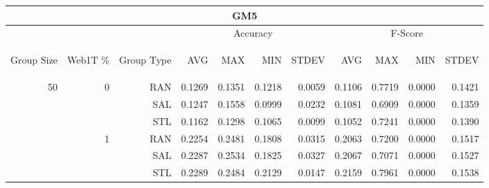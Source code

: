 \begin{center}
\begin{table}[htbp]
\begin{tabular}{ | r | r | r | r | r | r | r | r | r | r | r |}
\hline
\multicolumn{11}{|c|}{GM5}\\
\hline
 & & & \multicolumn{4}{|c|}{Accuracy} & \multicolumn{4}{|c|}{F-Score}\\ \cline{4-11}
\begin{sideways}Group Size\end{sideways} & \begin{sideways}Web1T \%\end{sideways} & \begin{sideways}Group Type\end{sideways} & \begin{sideways}AVG\end{sideways} & \begin{sideways}MAX\end{sideways} & \begin{sideways}MIN\end{sideways} & \begin{sideways}STDEV\end{sideways} & \begin{sideways}AVG\end{sideways} & \begin{sideways}MAX\end{sideways} & \begin{sideways}MIN\end{sideways} & \begin{sideways}STDEV\end{sideways}\\
\hline
\multirow{18}{*}{50}
 & \multirow{3}{*}{0} & RAN & 0.1269 & 0.1351 & 0.1218 & 0.0059 & 0.1106 & 0.7719 & 0.0000 & 0.1421\\ \cline{3-11}
 &   & SAL & 0.1247 & 0.1558 & 0.0999 & 0.0232 & 0.1081 & 0.6909 & 0.0000 & 0.1359\\ \cline{3-11}
 &   & STL & 0.1162 & 0.1298 & 0.1065 & 0.0099 & 0.1052 & 0.7241 & 0.0000 & 0.1390\\ \cline{2-11}
 & \multirow{3}{*}{1} & RAN & 0.2254 & 0.2481 & 0.1808 & 0.0315 & 0.2063 & 0.7200 & 0.0000 & 0.1517\\ \cline{3-11}
 &   & SAL & 0.2287 & 0.2534 & 0.1825 & 0.0327 & 0.2067 & 0.7071 & 0.0000 & 0.1527\\ \cline{3-11}
 &   & STL & 0.2289 & 0.2484 & 0.2129 & 0.0147 & 0.2159 & 0.7961 & 0.0000 & 0.1538\\ \cline{2-11}

\end{tabular}
\end{table}
\end{center}

